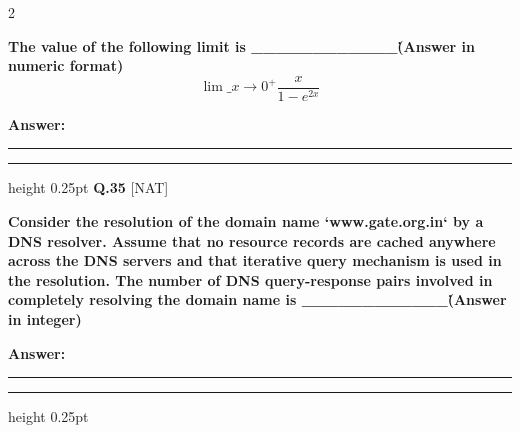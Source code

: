 \documentclass[a4paper,10pt,twoside]{article}
\begin{document}
\begin{multicols}{2}
\par\vspace{2pt}
{\bfseries The value of the following limit is \_\_\_\_\_\_\_\_\_\_\_\_\. (Answer in numeric format)
\[ \lim\_{x \to 0^+} \frac{x}{1 - e^{2x}} \] \par}
\par\vspace{3pt}\noindent\textbf{Answer:} \rule{3.2cm}{0.4pt}
\par\vspace{6pt}\hrule height 0.25pt\vspace{6pt}
\noindent\textbf{Q.35} \hfill {\footnotesize\textsf{[NAT]}}
\par\vspace{2pt}
{\bfseries Consider the resolution of the domain name `www.gate.org.in` by a DNS resolver. Assume that no resource records are cached anywhere across the DNS servers and that iterative query mechanism is used in the resolution. The number of DNS query-response pairs involved in completely resolving the domain name is \_\_\_\_\_\_\_\_\_\_\_\_\. (Answer in integer) \par}
\par\vspace{3pt}\noindent\textbf{Answer:} \rule{3.2cm}{0.4pt}
\par\vspace{6pt}\hrule height 0.25pt\vspace{6pt}

\vspace{6pt}
\vspace{3pt}


\end{multicols}
\end{document}
